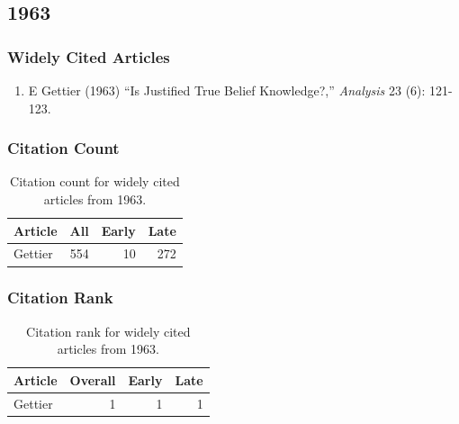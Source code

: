 \documentclass[
  10pt,
  letterpaper,
  DIV=11,
  numbers=noendperiod,
  twoside]{scrartcl}
\providecommand{\tightlist}{%
  \setlength{\itemsep}{0pt}\setlength{\parskip}{0pt}}\usepackage{longtable,booktabs,array}
\begin{document}
\newpage

\subsection{1963}\label{sec-s1963}

\subsubsection*{Widely Cited Articles}\label{widely-cited-articles-7}

\begin{enumerate}
\def\labelenumi{\arabic{enumi}.}
\tightlist
\item
  E Gettier (1963) ``Is Justified True Belief Knowledge?,''
  \emph{Analysis} 23 (6): 121-123.
\end{enumerate}

\subsubsection*{Citation Count}\label{sec-count-1963}

\begin{longtable}[]{@{}lrrr@{}}

\caption{\label{tbl-citation-count-1963}Citation count for widely cited
articles from 1963.}

\tabularnewline

\toprule\noalign{}
Article & All & Early & Late \\
\midrule\noalign{}
\endhead
\bottomrule\noalign{}
\endlastfoot
Gettier & 554 & 10 & 272 \\

\end{longtable}

\subsubsection*{Citation Rank}\label{sec-rank-1963}

\begin{longtable}[]{@{}lrrr@{}}

\caption{\label{tbl-citation-rank-1963}Citation rank for widely cited
articles from 1963.}

\tabularnewline

\toprule\noalign{}
Article & Overall & Early & Late \\
\midrule\noalign{}
\endhead
\bottomrule\noalign{}
\endlastfoot
Gettier & 1 & 1 & 1 \\

\end{longtable}
\end{document}
